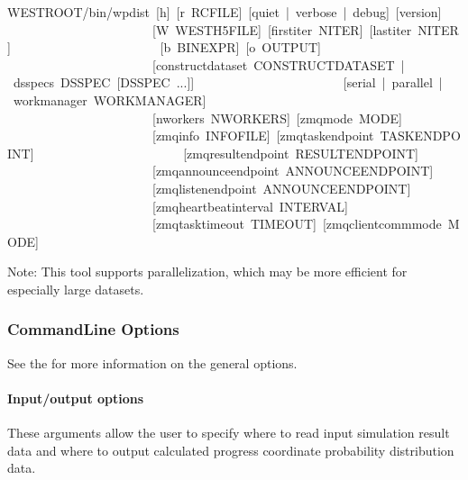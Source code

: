 \documentclass[letterpaper,10pt,english]{sphinxmanual}
\begin{document}
\begin{sphinxVerbatim}[commandchars=\\\{\}]
\PYGZdl{}WEST\PYGZus{}ROOT/bin/w\PYGZus{}pdist [\PYGZhy{}h] [\PYGZhy{}r RCFILE] [\PYGZhy{}\PYGZhy{}quiet | \PYGZhy{}\PYGZhy{}verbose | \PYGZhy{}\PYGZhy{}debug] [\PYGZhy{}\PYGZhy{}version]
                       [\PYGZhy{}W WEST\PYGZus{}H5FILE] [\PYGZhy{}\PYGZhy{}first\PYGZhy{}iter N\PYGZus{}ITER] [\PYGZhy{}\PYGZhy{}last\PYGZhy{}iter N\PYGZus{}ITER]
                       [\PYGZhy{}b BINEXPR] [\PYGZhy{}o OUTPUT]
                       [\PYGZhy{}\PYGZhy{}construct\PYGZhy{}dataset CONSTRUCT\PYGZus{}DATASET | \PYGZhy{}\PYGZhy{}dsspecs DSSPEC [DSSPEC ...]]
                       [\PYGZhy{}\PYGZhy{}serial | \PYGZhy{}\PYGZhy{}parallel | \PYGZhy{}\PYGZhy{}work\PYGZhy{}manager WORK\PYGZus{}MANAGER]
                       [\PYGZhy{}\PYGZhy{}n\PYGZhy{}workers N\PYGZus{}WORKERS] [\PYGZhy{}\PYGZhy{}zmq\PYGZhy{}mode MODE]
                       [\PYGZhy{}\PYGZhy{}zmq\PYGZhy{}info INFO\PYGZus{}FILE] [\PYGZhy{}\PYGZhy{}zmq\PYGZhy{}task\PYGZhy{}endpoint TASK\PYGZus{}ENDPOINT]
                       [\PYGZhy{}\PYGZhy{}zmq\PYGZhy{}result\PYGZhy{}endpoint RESULT\PYGZus{}ENDPOINT]
                       [\PYGZhy{}\PYGZhy{}zmq\PYGZhy{}announce\PYGZhy{}endpoint ANNOUNCE\PYGZus{}ENDPOINT]
                       [\PYGZhy{}\PYGZhy{}zmq\PYGZhy{}listen\PYGZhy{}endpoint ANNOUNCE\PYGZus{}ENDPOINT]
                       [\PYGZhy{}\PYGZhy{}zmq\PYGZhy{}heartbeat\PYGZhy{}interval INTERVAL]
                       [\PYGZhy{}\PYGZhy{}zmq\PYGZhy{}task\PYGZhy{}timeout TIMEOUT] [\PYGZhy{}\PYGZhy{}zmq\PYGZhy{}client\PYGZhy{}comm\PYGZhy{}mode MODE]
\end{sphinxVerbatim}

Note: This tool supports parallelization, which may be more efficient for
especially large datasets.


\subsubsection{Command\sphinxhyphen{}Line Options}
\label{\detokenize{users_guide/command_line_tools/w_pdist:command-line-options}}
See the  for more
information on the general options.


\paragraph{Input/output options}
\label{\detokenize{users_guide/command_line_tools/w_pdist:input-output-options}}
These arguments allow the user to specify where to read input simulation result
data and where to output calculated progress coordinate probability
distribution data.
\end{document}
